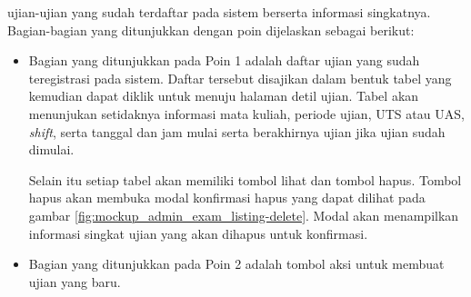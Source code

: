     ujian-ujian yang sudah terdaftar pada sistem berserta informasi singkatnya.
    Bagian-bagian yang ditunjukkan dengan poin dijelaskan sebagai berikut:
    \begin{itemize}
        \item Bagian yang ditunjukkan pada Poin 1 adalah daftar ujian yang sudah
            teregistrasi pada sistem. Daftar tersebut disajikan dalam bentuk
            tabel yang kemudian dapat diklik untuk menuju halaman detil ujian.
            Tabel akan menunjukan setidaknya informasi mata kuliah, periode
            ujian, UTS atau UAS, \textit{shift}, serta tanggal dan jam mulai
            serta berakhirnya ujian jika ujian sudah dimulai.
            
            Selain itu setiap tabel akan memiliki tombol lihat dan tombol hapus.
            Tombol hapus akan membuka modal konfirmasi hapus yang dapat dilihat
            pada gambar \ref{fig:mockup_admin_exam_listing-delete}. Modal akan
            menampilkan informasi singkat ujian yang akan dihapus untuk
            konfirmasi. 
        
        \item Bagian yang ditunjukkan pada Poin 2 adalah tombol aksi untuk
            membuat ujian yang baru.
    \end{itemize}
    
